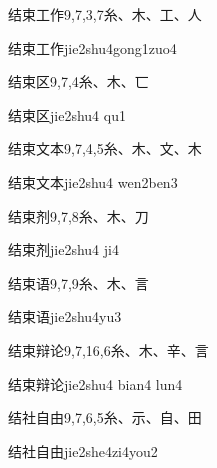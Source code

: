 \begin{entry}{结束工作}{9,7,3,7}{⽷、⽊、⼯、⼈}
  \begin{phonetics}{结束工作}{jie2shu4gong1zuo4}
  \end{phonetics}
\end{entry}

\begin{entry}{结束区}{9,7,4}{⽷、⽊、⼖}
  \begin{phonetics}{结束区}{jie2shu4 qu1}
  \end{phonetics}
\end{entry}

\begin{entry}{结束文本}{9,7,4,5}{⽷、⽊、⽂、⽊}
  \begin{phonetics}{结束文本}{jie2shu4 wen2ben3}
  \end{phonetics}
\end{entry}

\begin{entry}{结束剂}{9,7,8}{⽷、⽊、⼑}
  \begin{phonetics}{结束剂}{jie2shu4 ji4}
  \end{phonetics}
\end{entry}

\begin{entry}{结束语}{9,7,9}{⽷、⽊、⾔}
  \begin{phonetics}{结束语}{jie2shu4yu3}
  \end{phonetics}
\end{entry}

\begin{entry}{结束辩论}{9,7,16,6}{⽷、⽊、⾟、⾔}
  \begin{phonetics}{结束辩论}{jie2shu4 bian4 lun4}
  \end{phonetics}
\end{entry}

\begin{entry}{结社自由}{9,7,6,5}{⽷、⽰、⾃、⽥}
  \begin{phonetics}{结社自由}{jie2she4zi4you2}
  \end{phonetics}
\end{entry}

